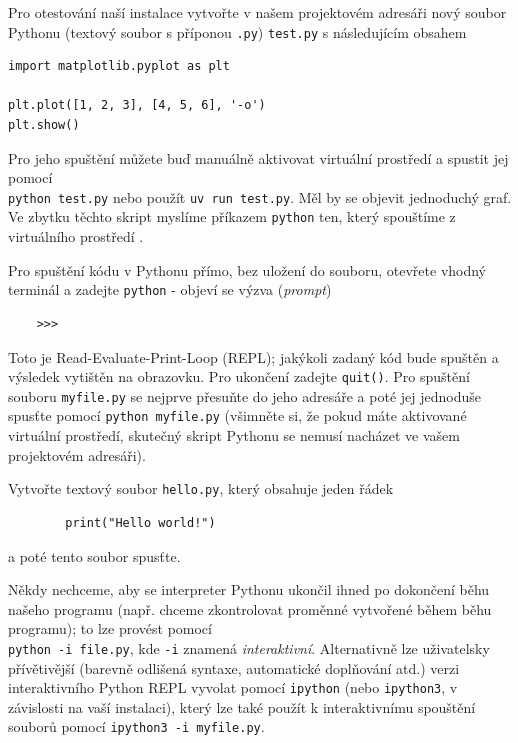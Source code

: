 Pro otestování naší instalace vytvořte v našem projektovém adresáři nový soubor Pythonu (textový soubor s příponou \verb|.py|) \verb|test.py| s následujícím obsahem
\begin{lstlisting}
import matplotlib.pyplot as plt

plt.plot([1, 2, 3], [4, 5, 6], '-o')
plt.show()
\end{lstlisting}
Pro jeho spuštění můžete buď manuálně aktivovat virtuální prostředí a spustit jej pomocí\\
\verb|python test.py| nebo použít \verb|uv run test.py|. Měl by se objevit jednoduchý graf. Ve zbytku těchto skript myslíme příkazem \verb|python| ten, který spouštíme z virtuálního prostředí .

Pro spuštění kódu v Pythonu přímo, bez uložení do souboru, otevřete vhodný terminál a zadejte \verb|python| - objeví se výzva (\emph{prompt})
\begin{lstlisting}
    >>>
\end{lstlisting}
Toto je Read-Evaluate-Print-Loop (REPL); jakýkoli zadaný kód bude spuštěn a výsledek vytištěn na obrazovku. Pro ukončení zadejte \verb|quit()|. Pro spuštění souboru \verb|myfile.py| se nejprve přesuňte do jeho adresáře a poté jej jednoduše spusťte pomocí \verb|python myfile.py| (všimněte si, že pokud máte aktivované virtuální prostředí, skutečný skript Pythonu se nemusí nacházet ve vašem projektovém adresáři).

\begin{exercise}
    Vytvořte textový soubor \verb|hello.py|, který obsahuje jeden řádek
    \begin{lstlisting}
        print("Hello world!")
    \end{lstlisting}
    a poté tento soubor spusťte.
\end{exercise}

Někdy nechceme, aby se interpreter Pythonu ukončil ihned po dokončení běhu našeho programu (např. chceme zkontrolovat proměnné vytvořené během běhu programu); to lze provést pomocí\\ \verb|python -i file.py|, kde \verb|-i| znamená \emph{interaktivní}. Alternativně lze uživatelsky přívětivější (barevně odlišená syntaxe, automatické doplňování atd.) verzi interaktivního Python REPL vyvolat pomocí \verb|ipython| (nebo \verb|ipython3|, v závislosti na vaší instalaci), který lze také použít k interaktivnímu spouštění souborů pomocí \verb|ipython3 -i myfile.py|.

